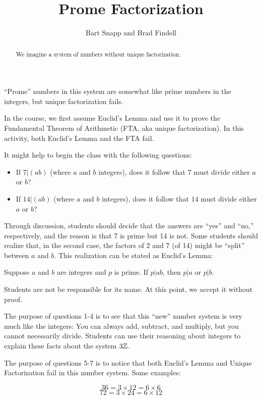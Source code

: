 \documentclass[nooutcomes]{ximera}
\title{Prome Factorization}
\author{Bart Snapp and Brad Findell}
\begin{document}
\begin{abstract}
  We imagine a system of numbers without unique factorization.
\end{abstract}
\maketitle

\label{A:Prome}

\begin{teachingnote}
``Prome'' numbers in this system are somewhat like prime numbers in the integers, but unique factorization fails.  

In the course, we first assume Euclid's Lemma and use it to prove the Fundamental Theorem of Arithmetic (FTA, aka unique factorization).  In this activity, both Euclid's Lemma and the FTA fail.

It might help to begin the class with the following questions:  
\begin{itemize}
\item If $7|(ab)$ (where $a$ and $b$ integers), does it follow that $7$ must divide either $a$ or $b$? 
\item If $14|(ab)$ (where $a$ and $b$ integers), does it follow that $14$ must divide either $a$ or $b$? 
\end{itemize}

Through discussion, students should decide that the answers are ``yes'' and ``no,'' respectively, and the reason is that 7 is prime but 14 is not.  Some students should realize that, in the second case, the factors of 2 and 7 (of 14) might be ``split'' between $a$ and $b$.  This realization can be stated as Euclid's Lemma:  

\begin{center}
Suppose $a$ and $b$ are integers and $p$ is prime.  If $p|ab$, then $p|a$ or $p|b$.  
\end{center}

Students are not be responsible for its name.  At this point, we accept it without proof.  

The purpose of questions 1-4 is to see that this ``new'' number system is very much like the integers:  You can always add, subtract, and multiply, but you cannot necessarily divide.  Students can use their reasoning about integers to explain these facts about the system $3\mathbb Z$.  

The purpose of questions 5-7 is to notice that both Euclid's Lemma and Unique Factorization fail in this number system.  Some examples:  

$$36 = 3\times 12 = 6\times 6$$
$$72 = 3\times 24=6\times 12$$
\end{teachingnote}
\end{document}
